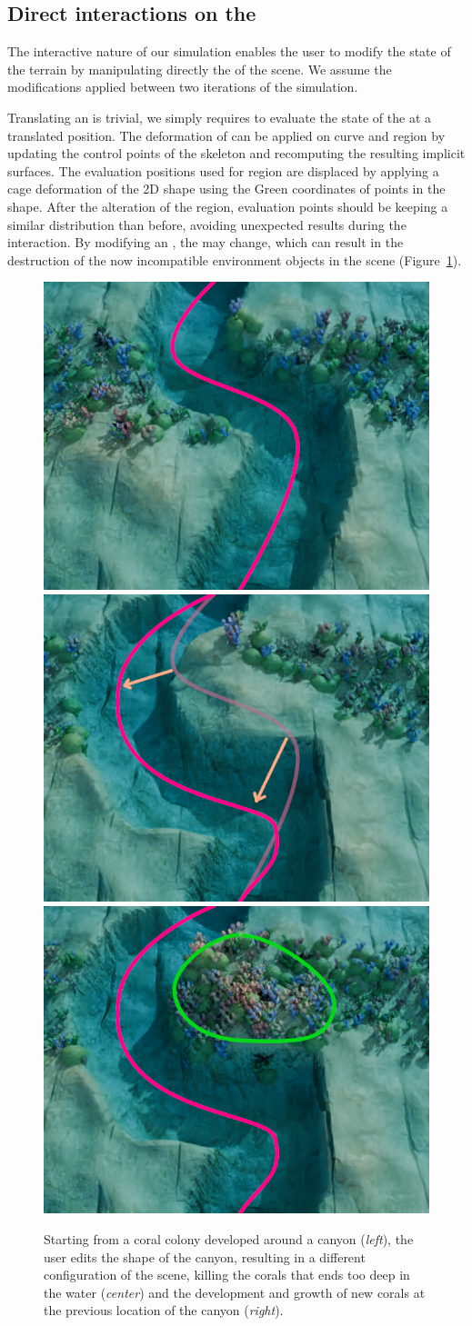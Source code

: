 \subsection{Direct interactions on the }
\label{sec:semantic-representation_manual-interaction}
The interactive nature of our simulation enables the user to modify the state of the terrain by manipulating directly the  of the scene. We assume the modifications applied between two iterations of the simulation.

Translating an  is trivial, we simply requires to evaluate the state of the  at a translated position. The deformation of  can be applied on curve and region  by updating the control points of the skeleton and recomputing the resulting implicit surfaces. The evaluation positions used for region  are displaced by applying a cage deformation of the 2D shape using the Green coordinates of points in the shape. After the alteration of the region, evaluation points should be keeping a similar distribution than before, avoiding unexpected results during the interaction.
By modifying an , the  may change, which can result in the destruction of the now incompatible environment objects in the scene (Figure~\ref{fig:semantic-representation_user-interaction}).

\begin{figure}
    \includegraphics[width = 0.3 \linewidth]{Figures/Interactions/InteractionEdition1.png}
    \includegraphics[width = 0.3 \linewidth]{Figures/Interactions/InteractionEdition2.png}
    \includegraphics[width = 0.3 \linewidth]{Figures/Interactions/InteractionEdition3.png}
    \caption{Starting from a coral colony developed around a canyon (\textit{left}), the user edits the shape of the canyon, resulting in a different configuration of the scene, killing the corals that ends too deep in the water (\textit{center}) and the development and growth of new corals at the previous location of the canyon (\textit{right}). }
    \label{fig:semantic-representation_user-interaction}
\end{figure}

